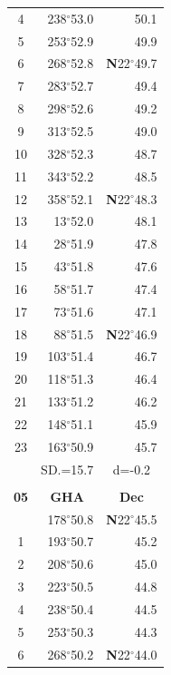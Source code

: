 \documentclass[10pt, a4paper]{report}
\begin{document}
\begin{scriptsize}
\begin{tabular*}{0.2\textwidth}[t]{@{\extracolsep{\fill}}|c|rr|}
4 & 238$^\circ$53.0 & 50.1\\
5 & 253$^\circ$52.9 & 49.9\\[2Pt]
6 & 268$^\circ$52.8 & \textbf{N}22$^\circ$49.7\\
7 & 283$^\circ$52.7 & 49.4\\
8 & 298$^\circ$52.6 & 49.2\\
9 & 313$^\circ$52.5 & \raisebox{0.24ex}{\boldmath$\cdot$~\boldmath$\cdot$~~}49.0\\
10 & 328$^\circ$52.3 & 48.7\\
11 & 343$^\circ$52.2 & 48.5\\[2Pt]
12 & 358$^\circ$52.1 & \textbf{N}22$^\circ$48.3\\
13 & 13$^\circ$52.0 & 48.1\\
14 & 28$^\circ$51.9 & 47.8\\
15 & 43$^\circ$51.8 & \raisebox{0.24ex}{\boldmath$\cdot$~\boldmath$\cdot$~~}47.6\\
16 & 58$^\circ$51.7 & 47.4\\
17 & 73$^\circ$51.6 & 47.1\\[2Pt]
18 & 88$^\circ$51.5 & \textbf{N}22$^\circ$46.9\\
19 & 103$^\circ$51.4 & 46.7\\
20 & 118$^\circ$51.3 & 46.4\\
21 & 133$^\circ$51.2 & \raisebox{0.24ex}{\boldmath$\cdot$~\boldmath$\cdot$~~}46.2\\
22 & 148$^\circ$51.1 & 45.9\\
23 & 163$^\circ$50.9 & 45.7\\
\hline
\rule{0pt}{2.4ex} & \multicolumn{1}{c}{SD.=15.7} & \multicolumn{1}{c|}{d=-0.2}\\
\hline
\multicolumn{1}{c}{}\\[-0.5ex]\hline
\multicolumn{1}{|c|}{\rule{0pt}{2.6ex}\textbf{05}} & \multicolumn{1}{c}{\textbf{GHA}} & \multicolumn{1}{c|}{\textbf{Dec}}\\
\hline\rule{0pt}{2.6ex}\noindent
0 & 178$^\circ$50.8 & \textbf{N}22$^\circ$45.5\\
1 & 193$^\circ$50.7 & 45.2\\
2 & 208$^\circ$50.6 & 45.0\\
3 & 223$^\circ$50.5 & \raisebox{0.24ex}{\boldmath$\cdot$~\boldmath$\cdot$~~}44.8\\
4 & 238$^\circ$50.4 & 44.5\\
5 & 253$^\circ$50.3 & 44.3\\[2Pt]
6 & 268$^\circ$50.2 & \textbf{N}22$^\circ$44.0\\

\end{tabular*}
\end{scriptsize}
\end{document}
